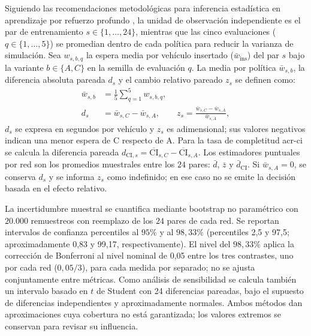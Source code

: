 Siguiendo las recomendaciones metodológicas para inferencia estadística en aprendizaje por refuerzo profundo \cite{Agarwal2021RLiable}, la unidad de observación independiente es el par de entrenamiento $s \in \{1,\ldots,24\}$, mientras que las cinco evaluaciones ($q \in \{1,\ldots,5\}$) se promedian dentro de cada política para reducir la varianza de simulación. Sea $w_{s,b,q}$ la espera media por vehículo insertado ($\bar{w}_{\mathrm{ins}}$) del par $s$ bajo la variante $b \in \{A,C\}$ en la semilla de evaluación $q$. La media por política $\bar{w}_{s,b}$, la diferencia absoluta pareada $d_s$ y el cambio relativo pareado $z_s$ se definen como:
\begin{equation}
 \begin{split}
 \bar w_{s,b}&=\frac{1}{5}\sum_{q=1}^{5}w_{s,b,q},\\
 d_s&=\bar w_{s,C}-\bar w_{s,A},\qquad
 z_s=\frac{\bar w_{s,C}-\bar w_{s,A}}{\bar w_{s,A}},
 \end{split}
 \label{eq:contrastes_pareados}
\end{equation}
$d_s$ se expresa en segundos por vehículo y $z_s$ es adimensional; sus valores negativos indican una menor espera de C respecto de A. Para la tasa de completitud \acrshort{acr-ci} se calcula la diferencia pareada $d_{\mathrm{CI},s} = \overline{\mathrm{CI}}_{s,C} - \overline{\mathrm{CI}}_{s,A}$. Los estimadores puntuales por red son los promedios muestrales entre los $24$ pares: $\bar{d}$, $\bar{z}$ y $\bar{d}_{\mathrm{CI}}$. Si $\bar{w}_{s,A}=0$, se conserva $d_s$ y se informa $z_s$ como indefinido; en ese caso no se emite la decisión basada en el efecto relativo.

La incertidumbre muestral se cuantifica mediante \gls{bootstrap} no paramétrico con $20.000$ remuestreos con reemplazo de los $24$ pares de cada red. Se reportan intervalos de confianza percentiles al $95\%$ y al $98{,}33\%$ (percentiles 2,5 y 97,5; aproximadamente 0,83 y 99,17, respectivamente). El nivel del $98{,}33\%$ aplica la corrección de Bonferroni al nivel nominal de 0,05 entre los tres contrastes, uno por cada red ($0{,}05/3$), para cada medida por separado; no se ajusta conjuntamente entre métricas. Como análisis de sensibilidad se calcula también un intervalo basado en $t$ de Student con 24 diferencias pareadas, bajo el supuesto de diferencias independientes y aproximadamente normales. Ambos métodos dan aproximaciones cuya cobertura no está garantizada; los valores extremos se conservan para revisar su influencia.

